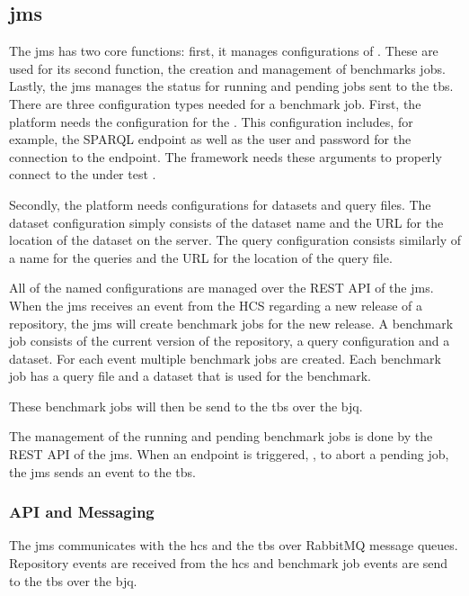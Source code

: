\subsection{\acl{jms}}
\label{sec:jobs_managing_service}
The \acf{jms} has two core functions: first, it manages configurations of \tsp{}.
These are used for its second function, the creation and management of benchmarks jobs.
Lastly, the \ac{jms} manages the status for running and pending jobs sent to the \ac{tbs}.
\\

There are three configuration types needed for a benchmark job.
First, the platform needs the configuration for the \ts{}.
This configuration includes, for example, the SPARQL endpoint as well as the user and password for the connection to the endpoint.
The \iguana{} framework needs these arguments to properly connect to the \ts{} under test \cite{IguanaDocsConfiguration}.

Secondly, the platform needs configurations for datasets and query files.
The dataset configuration simply consists of the dataset name and the URL for the location of the dataset on the server.
The query configuration consists similarly of a name for the queries and the URL for the location of the query file.

All of the named configurations are managed over the REST API of the \ac{jms}.
\\

When the \ac{jms} receives an event from the HCS regarding a new release of a repository, the \ac{jms} will create benchmark jobs for the new release.
A benchmark job consists of the current version of the repository, a query configuration and a dataset.
For each event multiple benchmark jobs are created.
Each benchmark job has a query file and a dataset that is used for the benchmark.

These benchmark jobs will then be send to the \ac{tbs} over the \acl{bjq}.

The management of the running and pending benchmark jobs is done by the REST API of the \ac{jms}.
When an endpoint is triggered, \eg, to abort a pending job, the \ac{jms} sends an event to the \ac{tbs}.


\subsubsection{API and Messaging}
\label{sec:jobs_api}
The \ac{jms} communicates with the \ac{hcs} and the \ac{tbs} over RabbitMQ message queues.
Repository events are received from the \ac{hcs} and benchmark job events are send to the \ac{tbs} over the \ac{bjq}.
\\

